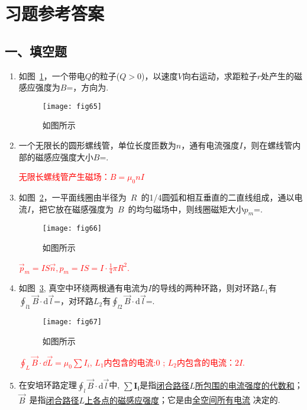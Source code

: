 \section{习题参考答案}
\subsection*{一、填空题}
\begin{enumerate}
    \item 如图~\ref{Fig:65}，一个带电$Q$的粒子($Q>0$)，以速度$V$向右运动，求距粒子$r$处产生的磁感应强度为$B$=，方向为.
    \begin{figure}[H]
        \centering
        \texttt{[image: fig65]}
        \caption{如图所示}\label{Fig:65}
    \end{figure}
    \item 一个无限长的圆形螺线管，单位长度匝数为$n$，通有电流强度$I$，则在螺线管内部的磁感应强度大小$B$=.
    \begin{note}
        \textcolor{red}{无限长螺线管产生磁场：$B=\mu_0 n I$}
    \end{note}
    \item 如图~\ref{Fig:66}，一平面线圈由半径为~$R$~的1/4圆弧和相互垂直的二直线组成，通以电流$I$，把它放在磁感强度为~$B$~的均匀磁场中，则线圈磁矩大小$p_m$=.
    \begin{figure}[H]
        \centering
        \texttt{[image: fig66]}
        \caption{如图所示}\label{Fig:66}
    \end{figure}
    \begin{note}
        \textcolor{red}{$\vec{p}_m=IS\vec{n}, p_m=IS=I\cdot \frac{1}{4}\pi R^2$.}
    \end{note}
    \item 如图~\ref{Fig:67}, 真空中环绕两根通有电流为$I$的导线的两种环路，则对环路$L_1$有$\oint_{l1}\vec{B}\cdot \mathrm{d}\vec{l}$=，对环路$L_2$有$\oint_{l2}\vec{B}\cdot \mathrm{d}\vec{l}$=.
    \begin{figure}[H]
        \centering
        \texttt{[image: fig67]}
        \caption{如图所示}\label{Fig:67}
    \end{figure}
    \begin{note}
        \textcolor{red}{$\oint_L \vec{B}\cdot \dd \vec{L}=\mu_0 \sum I_i$, $L_1$内包含的电流:0 ; $L_2$内包含的电流：$2I$.}
    \end{note}
    \item 在安培环路定理$\oint_{l} \vec{B}\cdot \mathrm{d}\vec{l}$中, $\sum \mathbf{I_i}$是指\underline{闭合路径$L$所包围的电流强度的代数和}；$\vec{B}$~是指\underline{闭合路径$L$上各点的磁感应强度}；它是由\underline{全空间所有电流} 决定的.

\end{enumerate}
